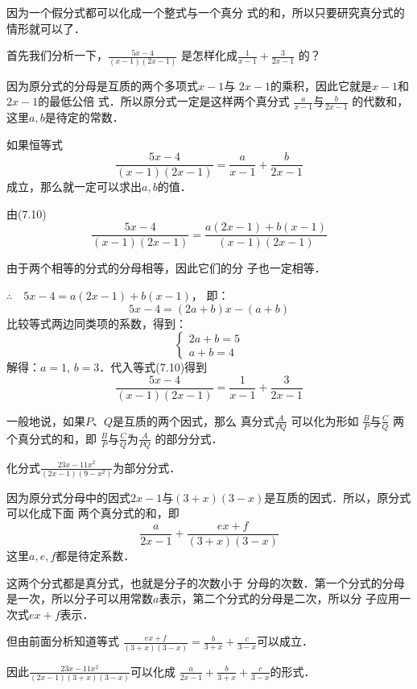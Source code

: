 因为一个假分式都可以化成一个整式与一个真分
式的和，所以只要研究真分式的情形就可以了．

首先我们分析一下，$\frac{5x-4}{(x-1)(2x-1)}$
是怎样化成$\frac{1}{x-1}+\frac{3}{2x-1}$
的？


因为原分式的分母是互质的两个多项式$x-1$与
$2x-1$的乘积，因此它就是$x-1$和$2x-1$的最低公倍
式．所以原分式一定是这样两个真分式
$\frac{a}{x-1}$与$\frac{b}{2x-1}$
的代数和，这里$a,b$是待定的常数．

如果恒等式
\begin{equation}
    \frac{5x-4}{(x-1)(2x-1)}=\frac{a}{x-1}+\frac{b}{2x-1}
\end{equation}
成立，那么就一定可以求出$a,b$的值．

由(7.10)
\[    \frac{5x-4}{(x-1)(2x-1)}=\frac{a(2x-1)+b(x-1)}{(x-1)(2x-1)}\]

由于两个相等的分式的分母相等，因此它们的分
子也一定相等．

$\therefore\quad 5x-4=a(2x-1)+b(x-1)$，
即：
\[5x-4=(2a+b)x-(a+b)\]
比较等式两边同类项的系数，得到：
\[\begin{cases}
    2a+b=5\\  a+b=4
\end{cases}\]
解得：$a=1$, $b=3$．代入等式(7.10)得到
\[\frac{5x-4}{(x-1)(2x-1)}=\frac{1}{x-1}+\frac{3}{2x-1}\]

一般地说，如果$P$、$Q$是互质的两个因式，那么
真分式$\frac{A}{PQ}$
可以化为形如
$\frac{B}{P}$与$\frac{C}{Q}$
两个真分式的和，即
$\frac{B}{P}$与$\frac{C}{Q}$为$\frac{A}{PQ}$
的部分分式．

\begin{example}
    化分式$\frac{23x-11x^2}{(2x-1)(9-x^2)}$为部分分式．
\end{example}

\begin{analyze}
    因为原分式分母中的因式$2x-1$与$(3+x)(3-x)$是互质的因式．所以，原分式可以化成下面
两个真分式的和，即
\[\frac{a}{2x-1}+\frac{ex+f}{(3+x)(3-x)}\]
这里$a,e,f$都是待定系数．

这两个分式都是真分式，也就是分子的次数小于
分母的次数．第一个分式的分母是一次，所以分子可以用常数$a$表示，第二个分式的分母是二次，所以分
子应用一次式$ex+f$表示．

但由前面分析知道等式
$\frac{ex+f}{(3+x)(3-x)}=\frac{b}{3+x}+\frac{c}{3-x}$可以成立．

因此$\frac{23x-11x^2}{(2x-1)(3+x)(3-x)}$可以化成 $\frac{a}{2x-1}+\frac{b}{3+x}+\frac{c}{3-x}$的形式．
\end{analyze}

